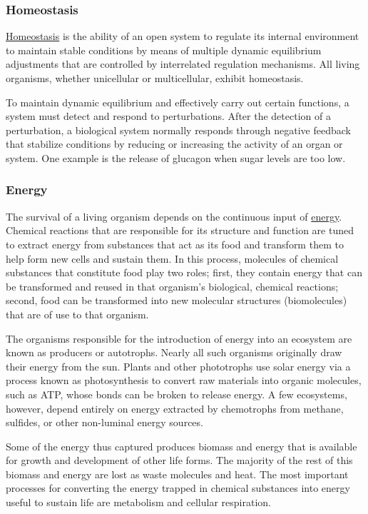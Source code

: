 \documentclass[
]{article}
\begin{document}
\hypertarget{homeostasis}{%
\subsubsection{Homeostasis}\label{homeostasis}}

\href{https://en.wikipedia.org/wiki/Homeostasis}{Homeostasis} is the
ability of an open system to regulate its internal environment to
maintain stable conditions by means of multiple dynamic equilibrium
adjustments that are controlled by interrelated regulation mechanisms.
All living organisms, whether unicellular or multicellular, exhibit
homeostasis.

To maintain dynamic equilibrium and effectively carry out certain
functions, a system must detect and respond to perturbations. After the
detection of a perturbation, a biological system normally responds
through negative feedback that stabilize conditions by reducing or
increasing the activity of an organ or system. One example is the
release of glucagon when sugar levels are too low.

\hypertarget{energy}{%
\subsubsection{Energy}\label{energy}}

The survival of a living organism depends on the continuous input of
\href{https://en.wikipedia.org/wiki/Energy}{energy}. Chemical reactions
that are responsible for its structure and function are tuned to extract
energy from substances that act as its food and transform them to help
form new cells and sustain them. In this process, molecules of chemical
substances that constitute food play two roles; first, they contain
energy that can be transformed and reused in that organism's biological,
chemical reactions; second, food can be transformed into new molecular
structures (biomolecules) that are of use to that organism.

The organisms responsible for the introduction of energy into an
ecosystem are known as producers or autotrophs. Nearly all such
organisms originally draw their energy from the sun. Plants and other
phototrophs use solar energy via a process known as photosynthesis to
convert raw materials into organic molecules, such as ATP, whose bonds
can be broken to release energy. A few ecosystems, however, depend
entirely on energy extracted by chemotrophs from methane, sulfides, or
other non-luminal energy sources.

Some of the energy thus captured produces biomass and energy that is
available for growth and development of other life forms. The majority
of the rest of this biomass and energy are lost as waste molecules and
heat. The most important processes for converting the energy trapped in
chemical substances into energy useful to sustain life are metabolism
and cellular respiration.
\end{document}
